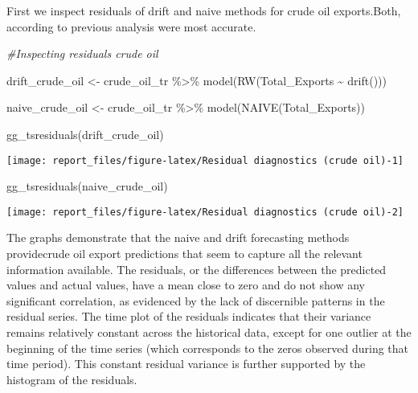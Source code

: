 \documentclass[
]{article}
\newenvironment{Shaded}{\begin{snugshade}}{\end{snugshade}}
\newcommand{\CommentTok}[1]{\textcolor[rgb]{0.56,0.35,0.01}{\textit{#1}}}
\newcommand{\FunctionTok}[1]{\textcolor[rgb]{0.00,0.00,0.00}{#1}}
\newcommand{\NormalTok}[1]{#1}
\newcommand{\OtherTok}[1]{\textcolor[rgb]{0.56,0.35,0.01}{#1}}
\newcommand{\SpecialCharTok}[1]{\textcolor[rgb]{0.00,0.00,0.00}{#1}}
\begin{document}
First we inspect residuals of drift and naive methods for crude oil
exports.Both, according to previous analysis were most accurate.

\begin{Shaded}
\begin{Highlighting}[]
\CommentTok{\#Inspecting residuals crude oil}

\NormalTok{drift\_crude\_oil }\OtherTok{\textless{}{-}}\NormalTok{ crude\_oil\_tr }\SpecialCharTok{\%\textgreater{}\%} 
  \FunctionTok{model}\NormalTok{(}\FunctionTok{RW}\NormalTok{(Total\_Exports }\SpecialCharTok{\textasciitilde{}} \FunctionTok{drift}\NormalTok{()))}

\NormalTok{naive\_crude\_oil }\OtherTok{\textless{}{-}}\NormalTok{ crude\_oil\_tr }\SpecialCharTok{\%\textgreater{}\%} 
  \FunctionTok{model}\NormalTok{(}\FunctionTok{NAIVE}\NormalTok{(Total\_Exports))}

\FunctionTok{gg\_tsresiduals}\NormalTok{(drift\_crude\_oil)}
\end{Highlighting}
\end{Shaded}

\begin{center}\texttt{[image: report\_files/figure-latex/Residual diagnostics (crude oil)-1]} \end{center}

\begin{Shaded}
\begin{Highlighting}[]
\FunctionTok{gg\_tsresiduals}\NormalTok{(naive\_crude\_oil)}
\end{Highlighting}
\end{Shaded}

\begin{center}\texttt{[image: report\_files/figure-latex/Residual diagnostics (crude oil)-2]} \end{center}

The graphs demonstrate that the naive and drift forecasting methods
providecrude oil export predictions that seem to capture all the
relevant information available. The residuals, or the differences
between the predicted values and actual values, have a mean close to
zero and do not show any significant correlation, as evidenced by the
lack of discernible patterns in the residual series. The time plot of
the residuals indicates that their variance remains relatively constant
across the historical data, except for one outlier at the beginning of
the time series (which corresponds to the zeros observed during that
time period). This constant residual variance is further supported by
the histogram of the residuals.
\end{document}
